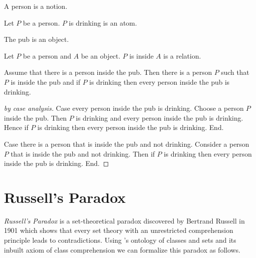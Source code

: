 \documentclass{article}
\begin{document}
  \begin{forthel}
    \begin{signature*}
      A person is a notion.
    \end{signature*}

    \begin{signature*}
      Let $P$ be a person.
      $P$ is drinking is an atom.
    \end{signature*}

    \begin{signature*}
      The pub is an object.
    \end{signature*}

    \begin{signature*}
      Let $P$ be a person and $A$ be an object.
      $P$ is inside $A$ is a relation.
    \end{signature*}

    \begin{theorem*}
      Assume that there is a person inside the pub.
      Then there is a person $P$ such that $P$ is inside the pub and if $P$ is
      drinking then every person inside the pub is drinking.
    \end{theorem*}
    \begin{proof}[by case analysis]
      Case every person inside the pub is drinking.
        Choose a person $P$ inside the pub.
        Then $P$ is drinking and every person inside the pub is drinking.
        Hence if $P$ is drinking then every person inside the pub is drinking.
      End.

      Case there is a person that is inside the pub and not drinking.
        Consider a person $P$ that is inside the pub and not drinking.
        Then if $P$ is drinking then every person inside the pub is drinking.
      End.
    \end{proof}
  \end{forthel}


  \section*{Russell's Paradox}

  \emph{Russell's Paradox} is a set-theoretical paradox discovered by Bertrand
  Russell in 1901 which shows that every set theory with an unrestricted
  comprehension principle leads to contradictions.
  Using \Naproche's ontology of classes and sets and its inbuilt axiom of class
  comprehension we can formalize this paradox as follows.
\end{document}

